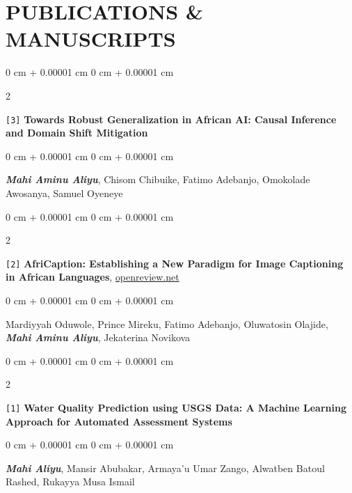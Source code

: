 \documentclass[11pt, letterpaper]{article}
\newenvironment{onecolentry}{
    \begin{adjustwidth}{
        0 cm + 0.00001 cm
    }{
        0 cm + 0.00001 cm
    }
}{
    \end{adjustwidth}
} %
\newenvironment{twocolentry}[2][]{
    \onecolentry
    \def\secondColumn{#2}
    \setcolumnwidth{\fill, 4.5 cm}
    \begin{paracol}{2}
}{
    \switchcolumn \raggedleft \secondColumn
    \end{paracol}
    \endonecolentry
} %
\begin{document}
    \section{PUBLICATIONS \& MANUSCRIPTS}
        \begin{samepage}
            \begin{twocolentry}{
                [Manuscript]
            }
                \texttt{[3]} \textbf{Towards Robust Generalization in African AI: Causal Inference and Domain Shift Mitigation}
            \end{twocolentry}
            \begin{onecolentry}
                \textbf{\textit{Mahi Aminu Aliyu}}, Chisom Chibuike, Fatimo Adebanjo, Omokolade Awosanya, Samuel Oyeneye\\
            \end{onecolentry}
        \end{samepage}

        \vspace{5 pt}
        
        \begin{samepage}
            \begin{twocolentry}{
                [Manuscript]
            }
                \texttt{[2]} \textbf{AfriCaption: Establishing a New Paradigm for Image Captioning in African Languages}, \href{https://openreview.net/forum?id=I75cUiYL0T}{openreview.net}
            \end{twocolentry}
            \begin{onecolentry}
                Mardiyyah Oduwole, Prince Mireku, Fatimo Adebanjo, Oluwatosin Olajide, \textbf{\textit{Mahi Aminu Aliyu}}, Jekaterina Novikova
            \end{onecolentry}
        \end{samepage}

        \vspace{5 pt}

        \begin{samepage}
            \begin{twocolentry}{
                [JISTM '25]
            }
                \texttt{[1]} \textbf{Water Quality Prediction using USGS Data: A Machine Learning Approach for Automated Assessment Systems}
            \end{twocolentry}
            \begin{onecolentry}
                \textbf{\textit{Mahi Aliyu}}, Mansir Abubakar, Armaya'u Umar Zango,  Alwatben Batoul Rashed, Rukayya Musa Ismail\\
            \end{onecolentry}
        \end{samepage}
\end{document}
